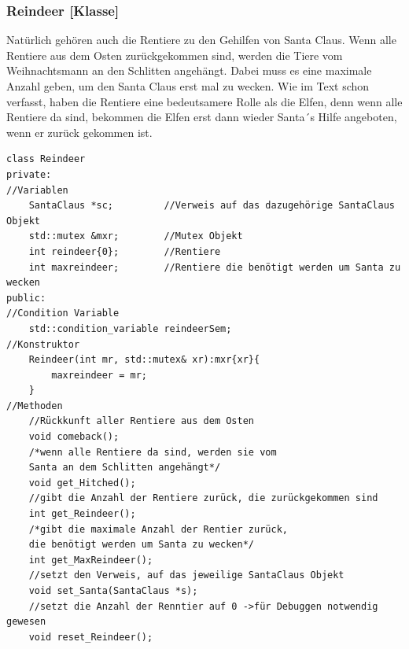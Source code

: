 \documentclass[a4paper,12pt]{article}
\begin{document}
\subsubsection{Reindeer [Klasse]}
Natürlich gehören auch die Rentiere zu den Gehilfen von Santa Claus. Wenn alle Rentiere aus dem Osten zurückgekommen sind,
werden die Tiere vom Weihnachtsmann an den Schlitten angehängt. Dabei muss es eine maximale Anzahl geben, um den Santa Claus erst mal zu wecken. Wie im Text schon verfasst, haben
die Rentiere eine bedeutsamere Rolle als die Elfen, denn wenn alle Rentiere da sind, bekommen die Elfen erst dann wieder Santa´s Hilfe angeboten, wenn er zurück gekommen ist.
\begin{verbatim}
class Reindeer
private:
//Variablen
    SantaClaus *sc;         //Verweis auf das dazugehörige SantaClaus Objekt
    std::mutex &mxr;        //Mutex Objekt
    int reindeer{0};        //Rentiere
    int maxreindeer;        //Rentiere die benötigt werden um Santa zu wecken
public:
//Condition Variable
    std::condition_variable reindeerSem;
//Konstruktor
    Reindeer(int mr, std::mutex& xr):mxr{xr}{
        maxreindeer = mr;
    }    
//Methoden
    //Rückkunft aller Rentiere aus dem Osten
    void comeback();
    /*wenn alle Rentiere da sind, werden sie vom 
    Santa an dem Schlitten angehängt*/
    void get_Hitched();
    //gibt die Anzahl der Rentiere zurück, die zurückgekommen sind
    int get_Reindeer();
    /*gibt die maximale Anzahl der Rentier zurück, 
    die benötigt werden um Santa zu wecken*/
    int get_MaxReindeer();
    //setzt den Verweis, auf das jeweilige SantaClaus Objekt
    void set_Santa(SantaClaus *s);
    //setzt die Anzahl der Renntier auf 0 ->für Debuggen notwendig gewesen
    void reset_Reindeer();
\end{verbatim}
\newpage
\end{document}
